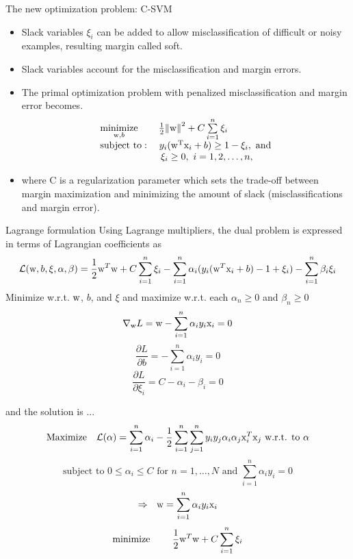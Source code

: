 \begin{frame}{The new optimization problem: C-SVM}
\begin{itemize}
\item Slack variables $\xi_i$ can be added to allow misclassification of difficult or noisy examples, resulting margin called soft.
\item Slack variables account for the misclassification and margin errors.
\item The primal optimization problem with
penalized misclassification and margin error becomes.
\begin{equation}
\begin{array}{l}
\mathop {\rm minimize}\limits_{{{\rm w}},b} ~~~~~~\frac{1}{2}{\left\| {{\rm w}} \right\|^2} + C\sum\limits_{i = 1}^{n} {{\xi_i}} \\
{\rm subject~to}:~~~{y_i}({\rm w^{T}}{\rm x}_i + b) \ge 1 - {\xi_i},~{\rm and} \\ ~~~~~~~~~~~~~~~~~~~{\xi_i} \ge 0,~i = 1,2,\ldots,{n},
\end{array}
\end{equation}
\item where C is a regularization parameter which sets the trade-off between margin maximization and minimizing the amount of slack (misclassifications and margin error). 
\end{itemize}
\end{frame}


\begin{frame}{Lagrange formulation}
Using Lagrange multipliers, the dual problem is expressed in terms of Lagrangian coefficients as
\[\mathcal{L}({\rm w},b,\xi ,\alpha ,\beta ) = \frac{1}{2}{{\rm w}^T}{\rm w} + C\sum\limits_{i = 1}^n {{\xi _i} - \sum\limits_{i = 1}^n {{\alpha _i}({y_i}({{\rm w}^T}{{\rm x}_i} + b) - 1 + {\xi _i}) - \sum\limits_{i = 1}^n {{\beta _i}{\xi _i}} } } \]
Minimize w.r.t. ${\rm w}$, $b$, and $\xi$  and maximize w.r.t. each $\alpha_n\geq 0$ and $\beta_n\geq 0$
\[{\nabla _{\rm w}}L = {\rm w} - \sum\limits_{i = 1}^n {{\alpha _i}{y_i}{{\rm x}_i} = 0} \]
\[\frac{{\partial L}}{{\partial b}} =  - \sum\limits_{i = 1}^n {{\alpha _i}{y_i} = 0} \]
\[\frac{{\partial L}}{{\partial {\xi _i}}} = C - {\alpha _i} - {\beta _i} = 0\]
\end{frame}

\begin{frame}{and the solution is ...}
\[\text{Maximize}~~~ \mathcal{L}(\alpha ) = \sum\limits_{i = 1}^n {{\alpha _i} - \frac{1}{2}\sum\limits_{i = 1}^n {\sum\limits_{j = 1}^n {{y_i}{y_j}{\alpha _i}{\alpha _j}{\rm x}_i^T{{\rm x}_j}\text{           w.r.t. to }\alpha } } } \]
\[\text{subject to }0 \leqslant {\alpha _i} \leqslant C\text{ for }n = 1, \ldots ,N\text{               and                }\sum\limits_{i = 1}^n {{\alpha _i}{y_i} = 0} \]
\[ \Rightarrow ~~{\rm w} = \sum\limits_{i = 1}^n {{\alpha _i}{y_i}{{\rm x}_i}} \]
\[\text{minimize}~~~~~~~\frac{1}{2}{{\rm w}^T}{\rm w} + C\sum\limits_{i = 1}^n {{\xi _i}} \]
\end{frame}

